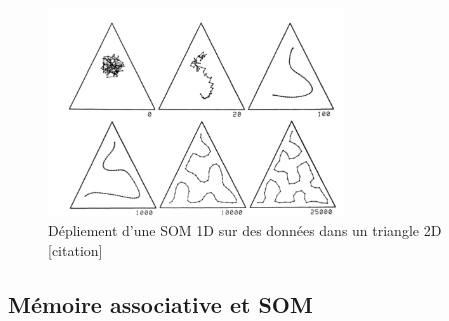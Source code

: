 \begin{figure}
\centering
\includegraphics[width=0.7\textwidth]{som1d}
\caption{Dépliement d'une SOM 1D sur des données dans un triangle 2D [citation]}
\label{fig:som1d}
\end{figure}

\subsection{Mémoire associative et SOM}


